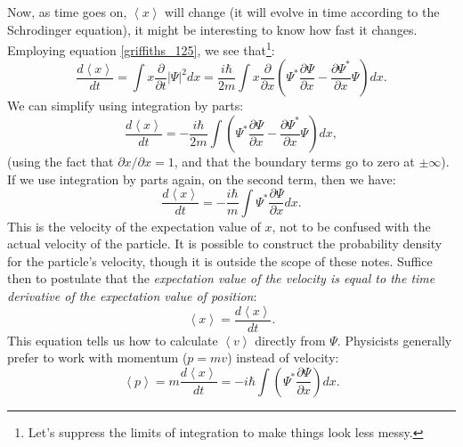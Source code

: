 \documentclass{article}
\begin{document}
Now, as time goes on, $\left< x \right>$ will change (it will evolve in time according to the Schrodinger equation), it might be interesting to know how fast it changes. Employing equation \ref{griffiths_125}, we see that\footnote{Let's suppress the limits of integration to make things look less messy.}:
\begin{equation}
\frac{d\left< x \right>}{dt} = \int x \frac{\partial}{\partial t} | \Psi |^{2} dx = \frac{i\hbar}{2m}\int x \frac{\partial}{\partial x} \left( \Psi^{*}\frac{\partial\Psi}{\partial x} - \frac{\partial \Psi^{*}}{\partial x}\Psi \right) dx.
\end{equation}
We can simplify using integration by parts:
\begin{equation}
\frac{d \left< x \right>}{dt} = -\frac{i\hbar}{2m}\int \left( \Psi^{*}\frac{\partial \Psi}{\partial x} - \frac{\partial \Psi^{*}}{\partial x} \Psi \right) dx,
\end{equation}
(using the fact that $\partial x / \partial x = 1$, and that the boundary terms go to zero at $\pm \infty$). If we use integration by parts again, on the second term, then we have:
\begin{equation}
\frac{d\left< x \right>}{dt} = -\frac{i\hbar}{m}\int\Psi^{*}\frac{\partial \Psi}{\partial x}dx.
\end{equation}
This is the velocity of the expectation value of $x$, not to be confused with the actual velocity of the particle. It is possible to construct the probability density for the particle's velocity, though it is outside the scope of these notes. Suffice then to postulate that the \emph{expectation value of the velocity is equal to the time derivative of the expectation value of position}:
\begin{equation}
\left< x \right> = \frac{d\left< x \right>}{dt}.
\end{equation}
This equation tells us how to calculate $\left < v \right>$ directly from $\Psi$. Physicists generally prefer to work with momentum ($p=mv$) instead of velocity:
\begin{equation}
\label{momentum}
\left< p \right> = m\frac{d\left< x \right>}{dt} = -i\hbar \int \left( \Psi^{*}\frac{\partial \Psi}{\partial x} \right) dx.
\end{equation}
\end{document}
